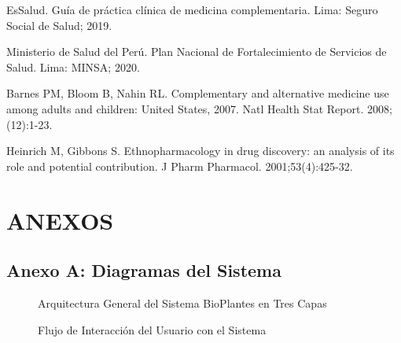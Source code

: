 \documentclass[12pt,a4paper]{article}
\begin{document}
\begin{thebibliography}{99}
EsSalud. Guía de práctica clínica de medicina complementaria. Lima: Seguro Social de Salud; 2019.

Ministerio de Salud del Perú. Plan Nacional de Fortalecimiento de Servicios de Salud. Lima: MINSA; 2020.

Barnes PM, Bloom B, Nahin RL. Complementary and alternative medicine use among adults and children: United States, 2007. Natl Health Stat Report. 2008;(12):1-23.

Heinrich M, Gibbons S. Ethnopharmacology in drug discovery: an analysis of its role and potential contribution. J Pharm Pharmacol. 2001;53(4):425-32.

\end{thebibliography}


\newpage
\section{ANEXOS}

\subsection{Anexo A: Diagramas del Sistema}

\begin{figure}[H]
    \centering
    \caption{Arquitectura General del Sistema BioPlantes en Tres Capas}
    \label{fig:arquitectura}
\end{figure}

\begin{figure}[H]
    \centering
    \caption{Flujo de Interacción del Usuario con el Sistema}
    \label{fig:flujo_usuario}
\end{figure}
\end{document}
